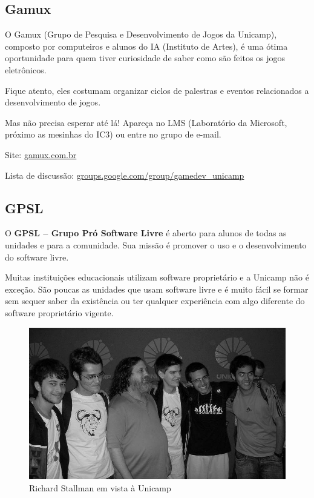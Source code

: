 \subsection{Gamux}

O Gamux (Grupo de Pesquisa e Desenvolvimento de Jogos da Unicamp), composto por
computeiros e alunos do IA (Instituto de Artes), é uma ótima oportunidade para
quem tiver curiosidade de saber como são feitos os jogos eletrônicos.

Fique atento, eles costumam organizar ciclos de palestras e eventos relacionados
a desenvolvimento de jogos.

Mas não precisa esperar até lá! Apareça no LMS (Laboratório da Microsoft,
próximo as mesinhas do IC3) ou entre no grupo de e-mail.

\begin{compactitemize}
    \item  Site: \url{gamux.com.br}
    \item  Lista de discussão: \url{groups.google.com/group/gamedev_unicamp}
\end{compactitemize}

\subsection{GPSL}

O \textbf{GPSL -- Grupo Pró Software Livre} é aberto para alunos de todas as
unidades e para a comunidade. Sua missão é promover o uso e o desenvolvimento do
software livre.

Muitas instituições educacionais utilizam software proprietário e a Unicamp não
é exceção. São poucas as unidades que usam software livre e é muito fácil se
formar sem sequer saber da existência ou ter qualquer experiência com algo
diferente do software proprietário vigente.

\begin{figure}[h!]
    \centering
    \includegraphics[scale=0.36]{img/alem_da_graduacao/gpsl_foto.jpg}
    \caption{Richard Stallman em vista à Unicamp}
\end{figure}

